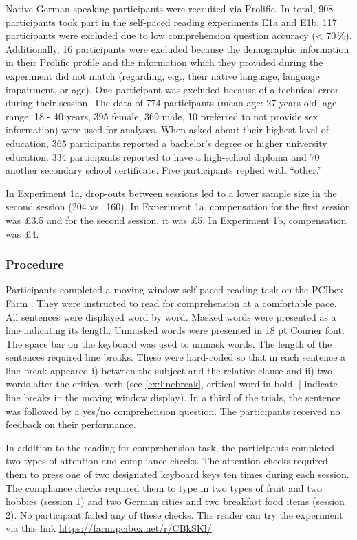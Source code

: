 \documentclass[a4paper, man, floatsintext]{apa7}
\begin{document}
Native German-speaking participants were recruited via Prolific. In total, 908 participants took part in the self-paced reading experiments E1a and E1b. 117 participants were excluded due to low comprehension question accuracy (< 70\,\%). Additionally, 16 participants were excluded because the demographic information in their Prolific profile and the information which they provided during the experiment did not match (regarding, e.g., their native language, language impairment, or age). One participant was excluded because of a technical error during their session. The data of 774 participants (mean age: 27 years old, age range: 18 - 40 years, 395 female, 369 male, 10 preferred to not provide sex information) were used for analyses. When asked about their highest level of education, 365 participants reported a bachelor's degree or higher university education. 334 participants reported to have a high-school diploma and 70 another secondary school certificate. Five participants replied with ``other.'' 

In Experiment 1a, drop-outs between sessions led to a lower sample size in the second session (204 vs.\ 160). In Experiment 1a, compensation for the first session was \pounds 3.5 and for the second session, it was \pounds 5. In Experiment 1b, compensation was \pounds 4. 

\subsubsection{Procedure}
Participants completed a moving window self-paced reading task \citep{just_etal_1982} on the PCIbex Farm \citep{pcibex}. They were instructed to read for comprehension at a comfortable pace. All sentences were displayed word by word. Masked words were presented as a line indicating its length. Unmasked words were presented in 18 pt Courier font. The space bar on the keyboard was used to unmask words. The length of the sentences required line breaks. These were hard-coded so that in each sentence a line break appeared i) between the subject and the relative clause and ii) two words after the critical verb (see \ref{ex:linebreak}, critical word in bold, | indicate line breaks in the moving window display). In a third of the trials, the sentence was followed by a yes/no comprehension question. The participants received no feedback on their performance.

In addition to the reading-for-comprehension task, the participants completed two types of attention and compliance checks. The attention checks required them to press one of two designated keyboard keys ten times during each session. The compliance checks required them to type in two types of fruit and two hobbies (session 1) and two German cities and two breakfast food items (session 2). No participant failed any of these checks. The reader can try the experiment via this link \hyperlink{https://farm.pcibex.net/r/CBkSKl/}{https://farm.pcibex.net/r/CBkSKl/}. 
\end{document}
